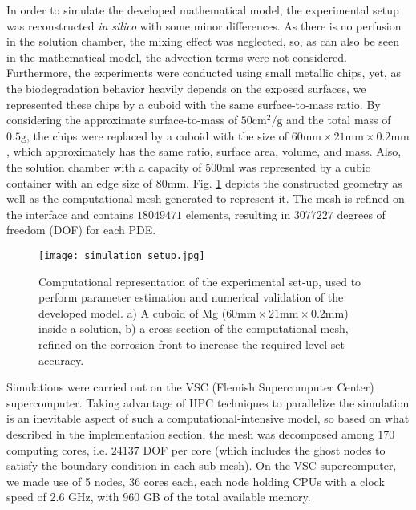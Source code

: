 In order to simulate the developed mathematical model, the experimental setup was reconstructed \textit{in silico} with some minor differences. As there is no perfusion in the solution chamber, the mixing effect was neglected, so, as can also be seen in the mathematical model, the advection terms were not considered. Furthermore, the experiments were conducted using small metallic chips, yet, as the biodegradation behavior heavily depends on the exposed surfaces, we represented these chips by a cuboid with the same surface-to-mass ratio. By considering the approximate surface-to-mass of $50 \mathrm{cm}^2/\mathrm{g}$ and the total mass of $0.5 \mathrm{g}$, the chips were replaced by a cuboid with the size of $60\mathrm{mm} \times 21\mathrm{mm} \times 0.2 \mathrm{mm}$, which approximately has the same ratio, surface area, volume, and mass. Also, the solution chamber with a capacity of $500 \mathrm{ml}$ was represented by a cubic container with an edge size of $80 \mathrm{mm}$. Fig. \ref{fig:simulation_setup} depicts the constructed geometry as well as the computational mesh generated to represent it. The mesh is refined on the interface and contains $\num{18049471}$ elements, resulting in $\num{3077227}$ degrees of freedom ({DOF}) for each {PDE}.

\begin{figure}[h]
\centering
\medskip
\texttt{[image: simulation\_setup.jpg]}
\caption[Simulation setup of the biodegradation tests]{Computational representation of the experimental set-up, used to perform parameter estimation and numerical validation of the developed model. a) A cuboid of Mg ($60 \mathrm{mm} \times 21 \mathrm{mm} \times 0.2 \mathrm{mm}$) inside a solution, b) a cross-section of the computational mesh, refined on the corrosion front to increase the required level set accuracy.} \label{fig:simulation_setup}
\end{figure}


Simulations were carried out on the VSC (Flemish Supercomputer Center) supercomputer. Taking advantage of {HPC} techniques to parallelize the simulation is an inevitable aspect of such a computational-intensive model, so based on what described in the implementation section, the mesh was decomposed among 170 computing cores, i.e. $\num{24137}$ {DOF} per core (which includes the ghost nodes to satisfy the boundary condition in each sub-mesh). On the VSC supercomputer, we made use of 5 nodes, 36 cores each, each node holding {CPU}s with a clock speed of 2.6 GHz, with 960 GB of the total available memory.

